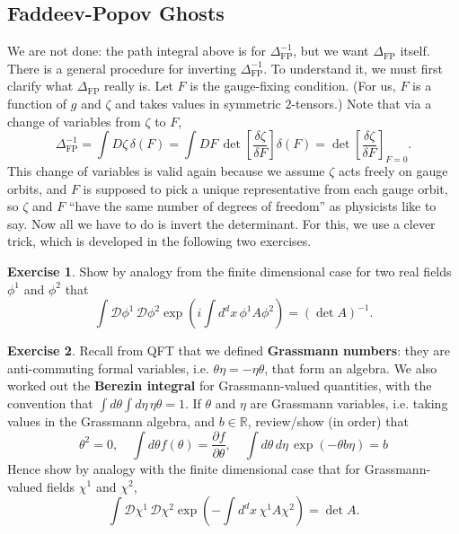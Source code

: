 \documentclass{report}
\theoremstyle{plain}
\theoremstyle{definition}
\newtheorem{exercise}{Exercise}[section]
\theoremstyle{remark}
\newcommand{\bR}{\mathbb{R}}
\newcommand{\cD}{\mathcal{D}}
\newcommand{\detFP}{\Delta_{\text{FP}}}
\newcommand{\pder}[2]{\frac{\partial #1}{\partial #2}}
\newcommand{\fder}[2]{\frac{\delta #1}{\delta #2}}
\begin{document}
\subsection{Faddeev-Popov Ghosts}

We are not done: the path integral above is for $\detFP^{-1}$, but we
want $\detFP$ itself. There is a general procedure for inverting
$\detFP^{-1}$. To understand it, we must first clarify what $\detFP$
really is. Let $F$ is the gauge-fixing condition. (For us, $F$ is a
function of $g$ and $\zeta$ and takes values in symmetric
$2$-tensors.) Note that via a change of variables from $\zeta$ to $F$,
\[ \detFP^{-1} = \int D\zeta \, \delta(F) = \int DF \, \det\left[\fder{\zeta}{F}\right] \delta(F) = \det\left[\fder{\zeta}{F}\right]_{F=0}. \]
This change of variables is valid again because we assume $\zeta$ acts
freely on gauge orbits, and $F$ is supposed to pick a unique
representative from each gauge orbit, so $\zeta$ and $F$ ``have the
same number of degrees of freedom'' as physicists like to say. Now all
we have to do is invert the determinant. For this, we use a clever
trick, which is developed in the following two exercises.

\begin{exercise}
  Show by analogy from the finite dimensional case for two real fields
  $\phi^1$ and $\phi^2$ that
  \[ \int \cD \phi^1 \, \cD \phi^2 \exp\left(i\int d^dx \, \phi^1 A \phi^2\right) = (\det A)^{-1}. \]
\end{exercise}

\begin{exercise}
  Recall from QFT that we defined {\bf Grassmann numbers}: they are
  anti-commuting formal variables, i.e. $\theta \eta = -\eta \theta$,
  that form an algebra. We also worked out the {\bf Berezin integral}
  for Grassmann-valued quantities, with the convention that $\int
  d\theta \int d\eta \, \eta\theta = 1$. If $\theta$ and $\eta$ are
  Grassmann variables, i.e. taking values in the Grassmann algebra,
  and $b \in \bR$, review/show (in order) that
  \[ \theta^2 = 0, \quad \int d\theta f(\theta) = \pder{f}{\theta}, \quad \int d\theta \, d\eta \, \exp(-\theta b\eta) = b \]
  Hence show by analogy with the finite dimensional case that for
  Grassmann-valued fields $\chi^1$ and $\chi^2$,
  \[ \int \cD \chi^1 \, \cD \chi^2 \exp\left(-\int d^dx \, \chi^1 A \chi^2\right) = \det A. \]
\end{exercise}
\end{document}

